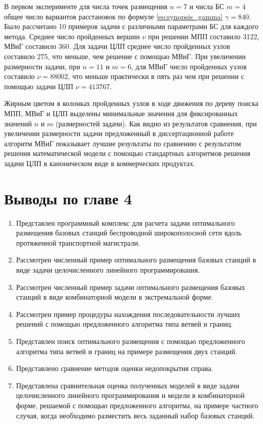 В первом эксперименте для числа точек размещения $n=7$ и числа БС $m=4$ общее число вариантов расстановок по формуле \cref{eq:synopsis_gamma} $\gamma = 840$. Было рассчитано 10 примеров задачи с различными параметрами БС для каждого метода. Среднее число пройденных вершин $\nu$ при решении МПП составило 3122, МВиГ составило 360. Для задачи ЦЛП  среднее число пройденных узлов составило 275, что меньше, чем решение с помощью МВиГ. При увеличении размерности задачи, при $n=11$ и $m=6$,  для МВиГ число пройденных узлов составило $\nu = 88002$, что меньше практически в пять раз чем при решении с помощью задачи ЦЛП $\nu=413767$.

Жирным цветом в колонках пройденных узлов в ходе движения по дереву поиска МПП, МВиГ и ЦЛП выделены минимальные значения для фиксированных значений $n$ и $m$ (размерностей задачи). Как видно из результатов сравнения, при увеличении размерности задачи предложенный в диссертационной работе алгоритм МВиГ показывает лучшие результаты по сравнению с результатом решения математической модели с помощью стандартных алгоритмов решения задачи ЦЛП в каноническом виде в коммерческих продуктах.

\FloatBarrier
\section{Выводы по главе 4}

\begin{enumerate}
  \item Представлен программный комплекс для расчета задачи оптимального размещения базовых станций беспроводной широкополосной сети вдоль протяженной транспортной магистрали.
  \item Рассмотрен численный пример оптимального размещения базовых станций в виде задачи целочисленного линейного программирования.
  \item Рассмотрен численный пример задачи оптимального размещения базовых станций  в виде комбинаторной модели в экстремальной форме.
  \item Рассмотрен пример процедуры нахождения последовательности лучших решений с помощью предложенного алгоритма типа ветвей и границ.
  \item Представлен поиск оптимального размещения с помощью предложенного алгоритма типа ветвей и границ на примере размещения двух станций.
  \item Представлено сравнение методов оценки недопокрытия справа.
  \item Представлена сравнительная оценка полученных моделей в виде задачи целочисленного линейного программирования и модели в комбинаторной форме, решаемой с помощью предложенного алгоритма, на примере частного случая, когда необходимо разместить весь заданный набор базовых станций.
\end{enumerate}
